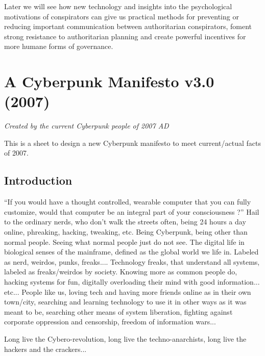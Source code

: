 \documentclass[letterpaper,12pt,english]{sphinxmanual}
\begin{document}
Later we will see how new technology and insights into the psychological motivations of conspirators can give us practical methods for preventing or reducing important communication between authoritarian conspirators, foment strong resistance to authoritarian planning and create powerful incentives for more humane forms of governance.


\chapter{A Cyberpunk Manifesto v3.0 (2007)}
\label{2007::doc}\label{2007:a-cyberpunk-manifesto-v3-0-2007}\label{2007:index-0}
\emph{Created by the current Cyberpunk people of 2007 AD}

This is a sheet to design a new Cyberpunk manifesto to meet current/actual facts of 2007.


\section{Introduction}
\label{2007:introduction}
``If you would have a thought controlled, wearable computer that you can fully customize, would that computer be an integral part of your consciousness ?'' Hail to the ordinary nerds, who don't walk the streets often, being 24 hours a day online, phreaking, hacking, tweaking, etc. Being Cyberpunk, being other than normal people. Seeing what normal people just do not see. The digital life in biological senses of the mainframe, defined as the global world we life in. Labeled as nerd, weirdos, punks, freaks.... Technology freaks, that understand all systems, labeled as freaks/weirdos by society. Knowing more as common people do, hacking systems for fun, digitally overloading their mind with good information... etc... People like us, loving tech and having more friends online as in their own town/city, searching and learning technology to use it in other ways as it was meant to be, searching other means of system liberation, fighting against corporate oppression and censorship, freedom of information wars...

Long live the Cybero-revolution, long live the techno-anarchists, long live the hackers and the crackers...
\end{document}
